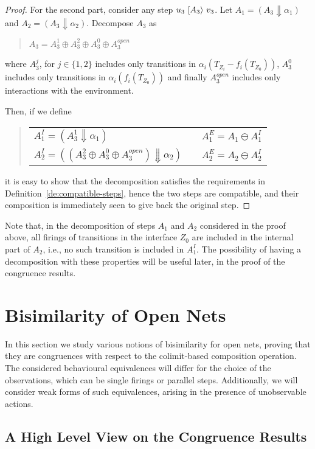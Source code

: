 \documentclass{LMCS}
\newcommand{\sres}[2]{\ensuremath{({#1}\!\Downarrow\!{#2})}}
\newcommand{\trans}[1]{\ensuremath{\ [\/{#1}\/\rangle}\ }
\begin{document}
\begin{proof}
  \bigskip 

  For the second part, consider any step $u_3 \trans{A_3} v_3$. Let
  $A_1 = \sres{A_3}{\alpha_1}$ and $A_2 = \sres{A_3}{\alpha_2}$.
  Decompose $A_3$ as
  \begin{quote}
    $A_3 = A_3^1 \oplus A_3^2 \oplus A_3^0 \oplus A_3^{open}$
  \end{quote}
  where $A_3^j$, for $j \in \{ 1, 2\}$ includes only transitions in
  $\alpha_i(T_{Z_i} - f_i(T_{Z_0}))$, $A^0_3$ includes only transitions in
  $\alpha_i(f_i(T_{Z_0}))$ and finally $A_3^{open}$ includes only
  interactions with the environment.

  Then, if we define
  \begin{quote}
    \begin{tabular}{lll}
      $A_1^I = \sres{A_3^1}{\alpha_1}$ & \hspace{10mm} & $A_1^E = A_1 \ominus A_1^I$\\
      $A_2^I = \sres{(A_3^2 \oplus A_3^0 \oplus A_3^{open})}{\alpha_2}$ & \quad & $A_2^E = A_2 \ominus A_2^I$
    \end{tabular}
  \end{quote}
  it is easy to show that the decomposition satisfies the requirements
  in Definition~\ref{de:compatible-steps}, hence the two steps are
  compatible, and their composition is immediately seen to give back
  the original step.
\end{proof}
Note that, in the decomposition of steps $A_1$ and $A_2$ considered in
the proof above, all firings of transitions in the interface $Z_0$ are
included in the internal part of $A_2$, i.e., no such transition is
included in $A_1^I$.  The possibility of having a decomposition with
these properties will be useful later, in the proof of the congruence
results.


\section{Bisimilarity of Open Nets}
\label{se:bisim}

In this section we study various notions of bisimilarity for open
nets, proving that they are congruences with respect to the
colimit-based composition operation. The considered behavioural
equivalences will differ for the choice of the observations, which can
be single firings or parallel steps. Additionally, we will consider
weak forms of such equivalences, arising in the presence of
unobservable actions.


\subsection{A High Level View on the Congruence Results}
\ \\
\end{document}
